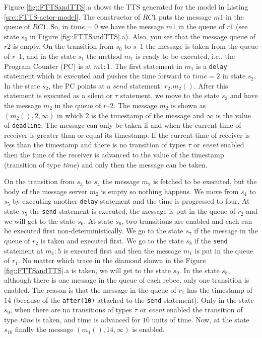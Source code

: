 Figure \ref{fig::FTTSandTTS}.a shows the TTS generated for the model in Listing \ref{src::FTTS-actor-model}. 
The constructor of $RC1$ puts the message $m1$ in the queue of $RC1$. So, in $time=0$ we have the message $m1$ in the queue of $r1$ (see state $s_0$ in Figure \ref{fig::FTTSandTTS}.a). Also, you see that the message queue of $r2$ is empty. On the transition from $s_0$ to $s–1$ the message is taken from the queue of $r–1$, and in the state $s_1$ the method $m_1$ is ready to be executed, i.e., the Program Counter (PC) is at $m1:1$. The first statement in $m_1$ is a \texttt{delay} statement which is executed and pushes the time forward to $time=2$ in state $s_2$.
In the state $s_2$, the PC points at a $send$ statement: $r_2.m_2()$. After this statement is executed as a silent or $\tau$ statement, we move to the state $s_3$ and have the message $m_2$ in the queue of $r–2$. The message $m_2$ is shown as $(m_2(), 2, \infty)$ in which $2$ is the timestamp of the message and $\infty$ is the value of \texttt{deadline}. The message can only be taken if and when the current time of receiver is greater than or equal its timestamp. If the current time of receiver is less than the timestamp and there is no transition of types  $\tau$  or \textit{event} enabled then the time of the receiver is advanced to the value of the timestamp (transition of type \textit{time}) and only then the message can be taken.


On the transition from $s_3$ to $s_4$ the message $m_2$ is fetched to be executed, but the body of the message server $m_2$ is empty so nothing happens. We move from $s_4$ to $s_5$ by executing another \texttt{delay} statement and the time is progressed to four.
At state $s_5$ the \texttt{send} statement is executed, the message is put in the queue of $r_2$ and we will get to the state $s_6$.
At state $s_6$, two transitions are enabled and each can be  executed first non-deterministically. 
We go to the state $s_7$ if the message in the queue of $r_2$ is taken and executed first. We go to the state $s_8$ if the \texttt{send} statement at $m_1:5$  is executed first and then the message $m_1$ is put in the queue of $r_1$. No matter which trace in the diamond shown in the Figure \ref{fig::FTTSandTTS}.a is taken, we will get to the state $s_9$.
In the state $s_8$, although there is one message in the queue of each rebec, only one transition is enabled. The reason is that   the message in the queue of $r_1$ has the timestamp of $14$ (because of the \texttt{after(10)} attached to the \texttt{send} statement).
Only in the state $s_9$, when there are no transitions of types $\tau$ or \textit{event}  enabled the transition of type \textit{time} is taken, and time is advanced for $10$ units of time. Now, at the state $s_10$ finally the message $(m_1(), 14,\infty )$ is enabled.

